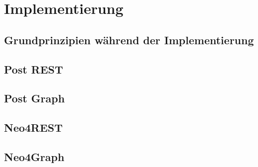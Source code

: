 \chapter{Implementierung} %
\label{sec:implementierung}

\section{Grundprinzipien während der Implementierung} %
\label{sec:datenmodell}

\section{Post REST} %
\label{sec:postrest}

\section{Post Graph} %
\label{sec:postgraph}

\section{Neo4REST} %
\label{sec:neo4rest}

\section{Neo4Graph} %
\label{sec:neo4graph}

